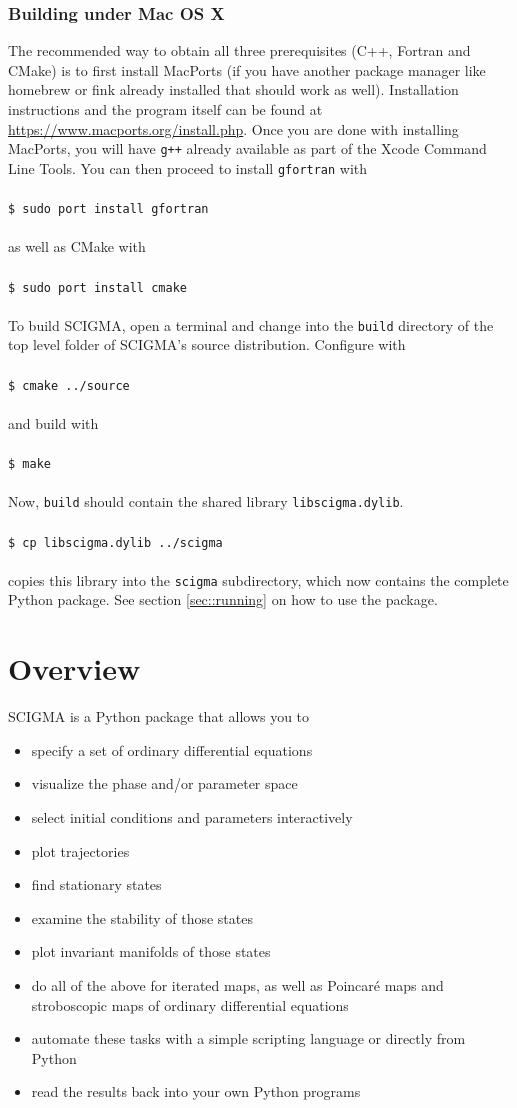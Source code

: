 \documentclass[10pt,a4paper,titlepage]{article}
\newcommand{\T}[1]{\texttt{#1}}
\newcommand{\C}[1]{\\\\\T{#1}\\\\}
\begin{document}
\subsubsection{Building under Mac OS X}
 The recommended way to obtain all three prerequisites (C++, Fortran and CMake) is to first install MacPorts (if you have another package manager like homebrew or fink already installed that should work as well). Installation instructions and the program itself can be found at \url{https://www.macports.org/install.php}. Once you are done with installing MacPorts, you will have \T{g++} already available as part of the Xcode Command Line Tools. You can then proceed to install \T{gfortran} with
\C{\$ sudo port install gfortran}
as well as CMake with
\C{\$ sudo port install cmake}
To build SCIGMA, open a terminal and change into the \T{build} directory of the top level folder of SCIGMA's source distribution. Configure with
\C{\$ cmake ../source}
and build with
\C{\$ make}
Now, \T{build} should contain the shared library \T{libscigma.dylib}.
\C{\$ cp libscigma.dylib ../scigma}
copies this library into the \T{scigma} subdirectory, which now contains the complete Python package. See section \ref{sec::running} on how to use the package.	
\newpage\section{Overview}
SCIGMA is a Python package that allows you to
\begin{itemize}
\item{specify a set of ordinary differential equations}
\item{visualize the phase and/or parameter space}
\item{select initial conditions and parameters interactively}
\item{plot trajectories}
\item{find stationary states}
\item{examine the stability of those states}
\item{plot invariant manifolds of those states}
\item{do all of the above for iterated maps, as well as
  Poincar\'e maps and stroboscopic maps of ordinary
  differential equations}
\item{automate these tasks with a simple scripting language
  or directly from Python}
\item{read the results back into your own Python programs}
\end{itemize}
\end{document}
